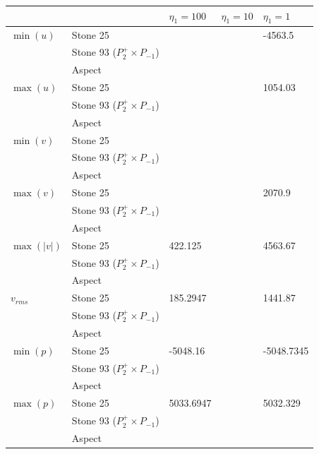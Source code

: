 \begin{center}
\begin{tabular}{llp{4cm}p{4cm}p{4cm}}
\hline
            &  & $\eta_1=100$ &  $\eta_1=10$ &  $\eta_1=1$ \\ 
\hline\hline
$\min(u)$   & Stone 25 &  & & -4563.5\\
            & Stone 93 ($P_2^+\times P_{-1}$) &  & &        \\
            & Aspect   &  & &        \\
\hline
$\max(u)$   & Stone 25 &  &  & 1054.03\\
            & Stone 93 ($P_2^+\times P_{-1}$)&  & &        \\
            & Aspect   &  & &        \\
\hline
$\min(v)$   & Stone 25 &  &  & \\
            & Stone 93 ($P_2^+\times P_{-1}$)&  & &        \\
            & Aspect   &  & &        \\
\hline
$\max(v)$   & Stone 25 &  &  & 2070.9\\
            & Stone 93 ($P_2^+\times P_{-1}$)&  & &        \\
            & Aspect   &  & &        \\
\hline
$\max(|v|)$ & Stone 25 & 422.125 & & 4563.67\\
            & Stone 93 ($P_2^+\times P_{-1}$)&  & &        \\
            & Aspect   &  & &        \\
\hline
$v_{rms}$   & Stone 25 & 185.2947 & & 1441.87\\
            & Stone 93 ($P_2^+\times P_{-1}$)&  & &        \\
            & Aspect   &  & &        \\
\hline
$\min(p)$   & Stone 25 & -5048.16 & & -5048.7345\\ 
            & Stone 93 ($P_2^+\times P_{-1}$)&  & &        \\
            & Aspect   &  & &        \\
\hline
$\max(p)$   & Stone 25 & 5033.6947 & & 5032.329\\
            & Stone 93 ($P_2^+\times P_{-1}$)&  & &        \\
            & Aspect   &  & &        \\
\hline
\end{tabular}
\end{center}






